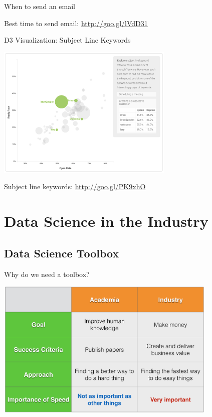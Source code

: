 \documentclass[10pt]{beamer}
\begin{document}
\begin{frame}{When to send an email}
\begin{overprint}
\begin{center}
            \end{center}
          \end{overprint}
      \centerline{\footnotesize Best time to send email: \url{http://goo.gl/lVdD31}}
    \end{frame}

    \begin{frame}{D3 Visualization: Subject Line Keywords}
      \begin{center}
        \includegraphics[height=180pt]{../graphs/email_analysis_subject_line}
      \end{center}    
      \centerline{\footnotesize Subject line keywords: \url{http://goo.gl/PK9xhO}}
    \end{frame}

\section{Data Science in the Industry}

  \subsection{Data Science Toolbox}
  
    \begin{frame}{Why do we need a toolbox?}
      \begin{center}
        \includegraphics[width=300pt]{../graphs/academia_industry}
      \end{center}
    \end{frame}
    
\end{document}
